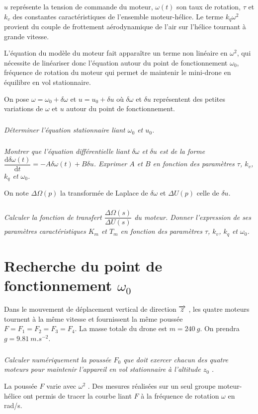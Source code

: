 \begin{multicols}{2}
$u$ représente la tension de commande du moteur, $\omega(t)$ son taux de rotation, $\tau$ et $k_v$ des constantes caractéristiques de l'ensemble moteur-hélice. Le terme $k_q\omega^2$ provient du couple de frottement aérodynamique de l'air sur l'hélice tournant à grande vitesse.

L'équation du modèle du moteur fait apparaître un terme non linéaire en $\omega^2$, qui nécessite de linéariser
donc l'équation autour du point de fonctionnement $\omega_0$, fréquence de rotation du moteur qui permet de
maintenir le mini-drone en équilibre en vol stationnaire.

On pose $\omega=\omega_0+\delta \omega$ et $u=u_0+\delta u$ où $\delta\omega$ et $\delta u$ représentent des petites variations de $\omega$ et $u$ autour du point de fonctionnement.

\subparagraph{}\textit{Déterminer l’équation stationnaire liant $\omega_0$ et $u_0$.}

\subparagraph{}\textit{Montrer que l'équation différentielle liant $\delta \omega$ et $\delta u$ est de la forme $\dfrac{\text{d}\delta \omega(t) }{\text{d}t}=-A\delta \omega(t) + B \delta u$. Exprimer $A$ et $B$ en fonction des paramètres $\tau$, $k_v$, $k_q$ et $\omega_0$.}

On note $\Delta \Omega (p)$ la transformée de Laplace de $\delta \omega$ et $\Delta U(p)$ celle de $\delta u$.


\subparagraph{}\textit{Calculer la fonction de transfert $\dfrac{\Delta{\Omega(s)}}{\Delta U(s)}$ du moteur. Donner l'expression de ses paramètres caractéristiques $K_m$ et $T_m$ en fonction des paramètres $\tau$, $k_v$, $k_q$ et $\omega_0$.}

\section*{Recherche du point de fonctionnement $\omega_0$}
Dans le mouvement de déplacement vertical de direction $\overrightarrow{z}$ , les quatre moteurs tournent à la même vitesse et fournissent la même poussée $F=F_1=F_2=F_3=F_4$.
La masse totale du drone est $m=\SI{240}{g}$. On prendra $g=\SI{9,81}{m.s^{-2}}$.

\subparagraph{}\textit{Calculer numériquement la poussée $F_0$ que doit exercer chacun des quatre moteurs pour maintenir l’appareil en vol stationnaire à l’altitude $z_0$ .}

La poussée $F$ varie avec $\omega^2$ . Des mesures réalisées sur un seul groupe moteur-hélice ont permis de tracer la courbe liant $F$ à la fréquence de rotation $\omega$ en rad/s.


\end{multicols}
